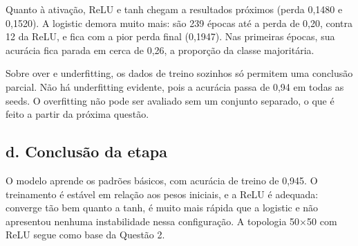 Quanto à ativação, ReLU e tanh chegam a resultados próximos (perda 0,1480 e 0,1520). A logistic demora muito mais: são
239 épocas até a perda de 0,20, contra 12 da ReLU, e fica com a pior perda final (0,1947). Nas primeiras épocas, sua
acurácia fica parada em cerca de 0,26, a proporção da classe majoritária.

Sobre over e underfitting, os dados de treino sozinhos só permitem uma conclusão parcial. Não há underfitting evidente,
pois a acurácia passa de 0,94 em todas as seeds. O overfitting não pode ser avaliado sem um conjunto separado, o que é
feito a partir da próxima questão.

\subsection*{d. Conclusão da etapa}

O modelo aprende os padrões básicos, com acurácia de treino de 0,945. O treinamento é estável em relação aos pesos iniciais,
e a ReLU é adequada: converge tão bem quanto a tanh, é muito mais rápida que a logistic e não apresentou nenhuma
instabilidade nessa configuração. A topologia 50$\times$50 com ReLU segue como base da Questão 2.

\FloatBarrier
